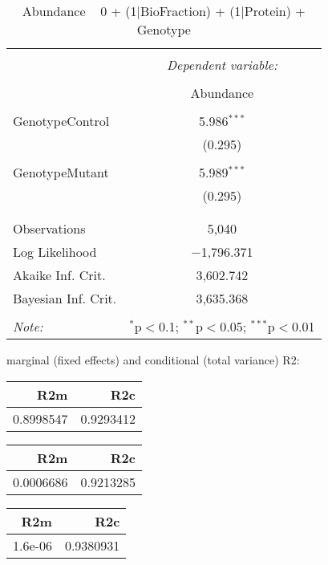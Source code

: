 \documentclass[11pt]{report}
\begin{document}
\begin{table}[!htbp] \centering 
  \caption{Abundance ~ 0 + (1|BioFraction) + (1|Protein) + Genotype} 
  \label{} 
\begin{tabular}{@{\extracolsep{5pt}}lc} 
\\[-1.8ex]\hline 
\hline \\[-1.8ex] 
 & \multicolumn{1}{c}{\textit{Dependent variable:}} \\ 
\cline{2-2} 
\\[-1.8ex] & Abundance \\ 
\hline \\[-1.8ex] 
 GenotypeControl & 5.986$^{***}$ \\ 
  & (0.295) \\ 
  & \\ 
 GenotypeMutant & 5.989$^{***}$ \\ 
  & (0.295) \\ 
  & \\ 
\hline \\[-1.8ex] 
Observations & 5,040 \\ 
Log Likelihood & $-$1,796.371 \\ 
Akaike Inf. Crit. & 3,602.742 \\ 
Bayesian Inf. Crit. & 3,635.368 \\ 
\hline 
\hline \\[-1.8ex] 
\textit{Note:}  & \multicolumn{1}{r}{$^{*}$p$<$0.1; $^{**}$p$<$0.05; $^{***}$p$<$0.01} \\ 
\end{tabular} 
\end{table} 
marginal (fixed effects) and conditional (total variance) R2:

\begin{tabular}{r|r}
\hline
R2m & R2c\\
\hline
0.8998547 & 0.9293412\\
\hline
\end{tabular}

\begin{tabular}{r|r}
\hline
R2m & R2c\\
\hline
0.0006686 & 0.9213285\\
\hline
\end{tabular}

\begin{tabular}{r|r}
\hline
R2m & R2c\\
\hline
1.6e-06 & 0.9380931\\
\hline
\end{tabular}
\end{document}
